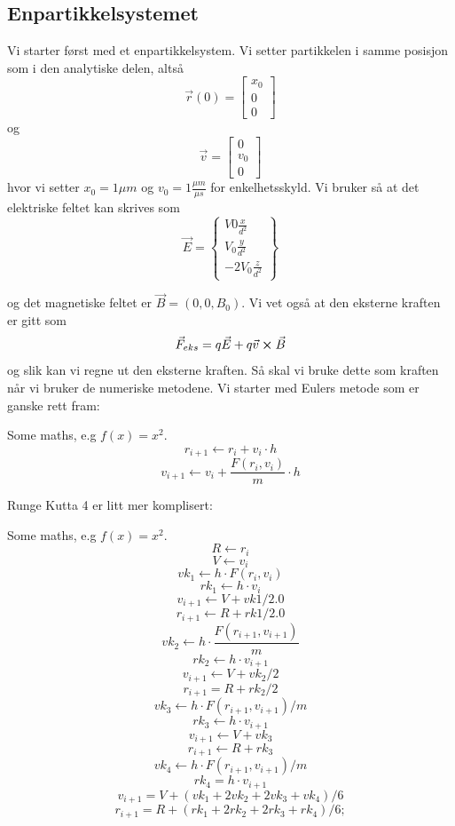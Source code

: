 \documentclass[reprint,english,notitlepage]{revtex4-1}  %
\begin{document}
\subsection*{Enpartikkelsystemet}
Vi starter først med et enpartikkelsystem. Vi setter partikkelen i samme posisjon som i den analytiske delen, altså
$$
\vec{r}(0)=\begin{bmatrix}
x_0 \\ 0 \\0
\end{bmatrix}
$$
og
$$
\vec{v}=\begin{bmatrix}
0\\v_0\\0
\end{bmatrix}
$$
hvor vi setter $x_0=1\mu m$ og $v_0=1\frac{\mu m}{\mu s}$ for enkelhetsskyld. Vi bruker så at det elektriske feltet kan skrives som
$$
\vec{E}=\begin{Bmatrix}
V0\frac{x}{d^2} \\V_0 \frac{y}{d^2}\\-2V_0 \frac{z}{d^2}
\end{Bmatrix}
$$

og det magnetiske feltet er $\vec{B}=(0,0,B_0)$. Vi vet også at den eksterne kraften er gitt som
$$
\vec{F}_{eks}=q\vec{E}+q\vec{v}\cross \vec{B}
$$
og slik kan vi regne ut den eksterne kraften.
Så skal vi bruke dette som kraften når vi bruker de numeriske metodene.
Vi starter med Eulers metode som er ganske rett fram:
\begin{algorithm}[H]
	\begin{algorithmic}
		\State Some maths, e.g $f(x) = x^2$. 
		\State $$
		r_{i+1}\leftarrow r_i+v_i \cdot h
		$$
		\State $$
		v_{i+1}\leftarrow v_i+\frac{F(r_i, v_i)}{m}\cdot h
		$$
		\EndFor
	\end{algorithmic}
\end{algorithm}
Runge Kutta 4 er litt mer komplisert:
\begin{algorithm}[H]
	\begin{algorithmic}
		\State Some maths, e.g $f(x) = x^2$. 
		\For{$i = 0, 1, ..., N-1$}
		\State $$
		R\leftarrow r_i
		$$$$
		V\leftarrow v_i
		$$$$
		vk_1\leftarrow h\cdot F(r_i, v_i)
		$$$$
		rk_1\leftarrow h\cdot v_i
		$$$$
		v_{i+1}\leftarrow V+vk1/2.0
		$$$$
		r_{i+1}\leftarrow R+rk1/2.0
		$$
		$$
		vk_2\leftarrow h\cdot \frac{F(r_{i+1},v_{i+1})}{m}
		$$$$
		rk_2\leftarrow h\cdot v_{i+1}
		$$
		$$
		v_{i+1}\leftarrow V+vk_2/2
		$$$$
		r_{i+1}=R+rk_2/2
		$$
		$$
		vk_3\leftarrow h\cdot F(r_{i+1}, v_{i+1})/m
		$$$$
		rk_3\leftarrow h\cdot v_{i+1}
		$$
		$$
		v_{i+1}\leftarrow V+vk_3$$$$
		r_{i+1}\leftarrow R+rk_3
		$$
		$$
		vk_4\leftarrow h\cdot  F(r_{i+1}, v_{i+1})/m$$$$
		rk_4=h\cdot v_{i+1}
		$$
		$$
		v_{i+1}=V+(vk_1+2vk_2+2vk_3+vk_4)/6$$$$
		r_{i+1}=R+(rk_1+2rk_2+2rk_3+rk_4)/6;
		$$
		\EndFor
	\end{algorithmic}
\end{algorithm}
\end{document}
